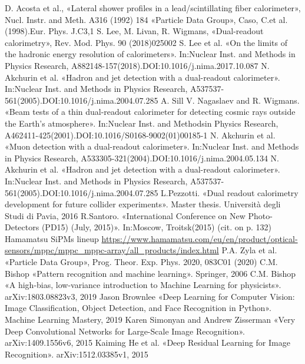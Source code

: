 \documentclass[a4paper,11pt,titlepage,oneside]{book}	%
\begin{document}
\begin{backmatter}
\begin{thebibliography}{99}
			 D. Acosta et al., «Lateral shower profiles in a lead/scintillating fiber calorimeter», Nucl. Instr. and Meth. A316 (1992) 184
			 «Particle Data Group», Caso, C.et al.(1998).Eur. Phys. J.C3,1
			 S. Lee, M. Livan, R. Wigmans, «Dual-readout calorimetry», Rev. Mod. Phys. 90 (2018)025002
			 S. Lee et al. «On the limits of the hadronic energy resolution of calorimeters». In:Nuclear Inst. and Methods in Physics Research, A882148-157(2018).DOI:10.1016/j.nima.2017.10.087
			 N. Akchurin et al. «Hadron and jet detection with a dual-readout calorimeter». In:Nuclear Inst. and Methods in Physics Research, A537537-561(2005).DOI:10.1016/j.nima.2004.07.285
			 A. Sill V. Nagaslaev and R. Wigmans. «Beam tests of a thin dual-readout calorimeter for detecting cosmic rays outside the Earth’s atmosphere». In:Nuclear Inst. and Methodsin Physics Research, A462411-425(2001).DOI:10.1016/S0168-9002(01)00185-1
			 N. Akchurin et al. «Muon detection with a dual-readout calorimeter». In:Nuclear Inst. and Methods in Physics Research, A533305-321(2004).DOI:10.1016/j.nima.2004.05.134
			 N. Akchurin et al. «Hadron and jet detection with a dual-readout calorimeter». In:Nuclear Inst. and Methods in Physics Research, A537537-561(2005).DOI:10.1016/j.nima.2004.07.285
			 L.Pezzotti. «Dual readout calorimetry development for future collider experiments». Master thesis. Università degli Studi di Pavia, 2016
			 R.Santoro. «International Conference on New Photo-Detectors (PD15) (July, 2015)». In:Moscow, Troitsk(2015) (cit. on p. 132)
			 Hamamatsu SiPMs lineup \url{https://www.hamamatsu.com/eu/en/product/optical-sensors/mppc/mppc_mppc-array/all_products/index.html}
			 P.A. Zyla et al. «Particle Data Group», Prog. Theor. Exp. Phys. 2020, 083C01 (2020)
			 C.M. Bishop «Pattern recognition and machine learning». Springer, 2006
			 C.M. Bishop «A high-bias, low-variance introduction to Machine Learning for physicists». arXiv:1803.08823v3, 2019
			 Jason Brownlee «Deep Learning for Computer Vision: Image Classification, Object Detection, and Face Recognition in Python». Machine Learning Mastery, 2019
			 Karen Simonyan and Andrew Zisserman «Very Deep Convolutional Networks for Large-Scale Image Recognition». arXiv:1409.1556v6, 2015
			 Kaiming He et al. «Deep Residual Learning for Image Recognition». arXiv:1512.03385v1, 2015
		\end{thebibliography}
		
	\end{backmatter}
	
	
\end{document}
